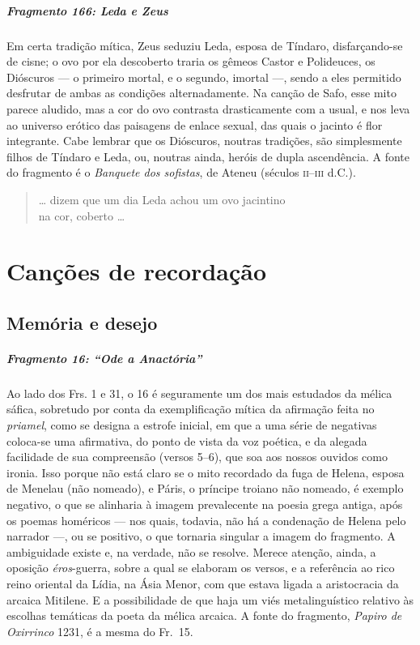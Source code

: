 \paragraph{Fragmento 166: Leda e Zeus}

{\small Em certa tradição mítica, Zeus seduziu Leda, esposa de Tíndaro, disfarçando-se
de cisne; o ovo por ela descoberto traria os gêmeos Castor e Polideuces, os
Dióscuros --- o primeiro mortal, e o segundo, imortal ---, sendo a eles
permitido desfrutar de ambas as condições alternadamente. Na canção de Safo,
esse mito parece aludido, mas a cor do ovo contrasta drasticamente com a usual,
e nos leva ao universo erótico das paisagens de enlace sexual, das quais o
jacinto é flor integrante. Cabe lembrar que os Dióscuros, noutras tradições,
são simplesmente filhos de Tíndaro e Leda, ou, noutras ainda, heróis de dupla
ascendência. A fonte do fragmento é o \textit{Banquete dos sofistas}, de Ateneu
(séculos \textsc{ii}--\textsc{iii} d.C.).}

\begin{verse}
\ldots{} dizem que um dia Leda achou um ovo jacintino\\
na cor, coberto \ldots{}
\end{verse}


\chapter{Canções de recordação}

\section{Memória e desejo}

\paragraph{Fragmento 16: ``Ode a Anactória''}

{\small Ao lado dos Frs. 1 e 31, o 16 é seguramente um dos mais estudados da mélica
sáfica, sobretudo por conta da exemplificação mítica da afirmação feita no
\textit{priamel}, como se designa a estrofe inicial, em que a uma série de
negativas coloca-se uma afirmativa, do ponto de vista da voz poética, e da
alegada facilidade de sua compreensão (versos 5--6), que soa aos nossos ouvidos
como ironia. Isso porque não está claro se o mito recordado da fuga de Helena, esposa 
de Menelau (não nomeado), e Páris, o príncipe troiano não nomeado, é exemplo
negativo, o que se alinharia à imagem prevalecente na poesia grega antiga, após
os poemas homéricos --- nos quais, todavia, não há a condenação de Helena pelo
narrador ---, ou se positivo, o que tornaria singular a imagem do fragmento. A
ambiguidade existe e, na verdade, não se resolve. Merece atenção, ainda, a
oposição \textit{éros}{}-guerra, sobre a qual se elaboram os versos, e a
referência ao rico reino oriental da Lídia, na Ásia Menor, com que estava
ligada a aristocracia da arcaica Mitilene. E a possibilidade de que haja um
viés metalinguístico relativo às escolhas temáticas da poeta da mélica arcaica.
A fonte do fragmento, \textit{Papiro de Oxirrinco} 1231, é a mesma do Fr.~15.}


